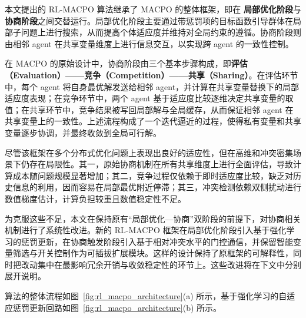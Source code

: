 \documentclass[12pt]{ctexart}
\begin{document}
本文提出的 RL-MACPO 算法继承了 MACPO 的整体框架，即在
\textbf{局部优化阶段}与\textbf{协商阶段}之间交替运行。局部优化阶段主要通过带惩罚项的目标函数引导群体在局部子问题上进行搜索，从而提高个体适应度并维持对全局约束的遵循。协商阶段则由相邻
agent 在共享变量维度上进行信息交互，以实现跨 agent 的一致性控制。

在 MACPO
的原始设计中，协商阶段由三个基本步骤构成，即\textbf{评估（Evaluation）------竞争（Competition）------共享（Sharing）}。在评估环节中，每个
agent 将自身最优解发送给相邻
agent，并计算在共享变量替换下的局部适应度表现；在竞争环节中，两个 agent
基于适应度比较逐维决定共享变量的取值；在共享环节中，竞争结果被写回局部解与全局缓存，从而保证相邻
agent
在共享变量上的一致性。上述流程构成了一个迭代逼近的过程，使得私有变量和共享变量逐步协调，并最终收敛到全局可行解。

尽管该框架在多个分布式优化问题上表现出良好的适应性，但在高维和冲突密集场景下仍存在局限性。其一，原始协商机制在所有共享维度上进行全面评估，导致计算成本随问题规模显著增加；其二，竞争过程仅依赖于即时适应度比较，缺乏对历史信息的利用，因而容易在局部最优附近停滞；其三，冲突检测依赖双侧扰动进行数值梯度估计，计算负担较重且数值稳定性不足。

为克服这些不足，本文在保持原有``局部优化---协商''双阶段的前提下，对协商相关机制进行了系统性改进。新的 RL-MACPO 框架在局部优化阶段引入基于强化学习的惩罚更新，在协商触发阶段引入基于相对冲突水平的门控通信，并保留智能变量筛选与开关控制作为可插拔扩展模块。这样的设计保持了原框架的可解释性，同时把改动集中在最影响冗余开销与收敛稳定性的环节上。这些改进将在下文中分别展开说明。

算法的整体流程如图~\ref{fig:rl_macpo_architecture}(a) 所示，基于强化学习的自适应惩罚更新回路如图~\ref{fig:rl_macpo_architecture}(b) 所示。
\end{document}
